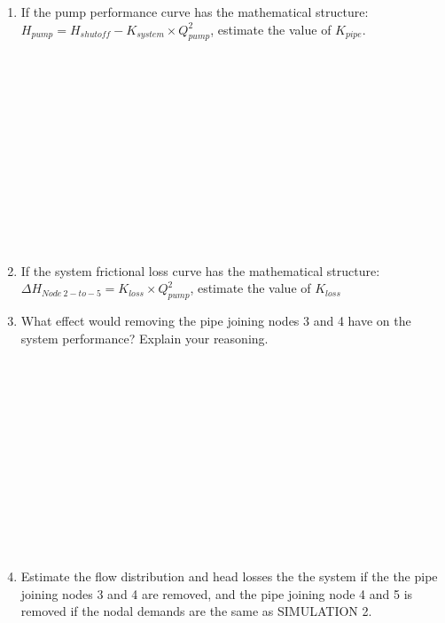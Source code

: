 \documentclass[11pt]{article}
\begin{document}
\begin{enumerate}
\begin{enumerate}
\item If the pump performance curve has the mathematical structure: ~\\
$H_{pump} = H_{shutoff} - K_{system} \times Q_{pump}^2$, estimate the value of $K_{pipe}$.
\\
\\
\\
\\
\\
\\
\\
\\
\\
\\
\\
\\
\\
\item If the system frictional loss curve has the mathematical structure: ~\\
 $\Delta H_{Node~2 -to- 5}= K_{loss} \times Q_{pump}^2$, estimate the value of $K_{loss}$

\clearpage
\item What effect would removing the pipe joining nodes 3 and 4 have on the system performance?   Explain your reasoning.
\\
\\
\\
\\
\\
\\
\\
\\
\\
\\
\\
\\
\\
\item Estimate the flow distribution and head losses the the system if the the pipe joining nodes 3 and 4 are removed, and the pipe joining node 4 and 5 is removed if the nodal demands are the same as SIMULATION  2.
\end{enumerate} 

\begin{figure}[ht!] %
\centering


\end{figure}
\end{enumerate}
\end{document}
